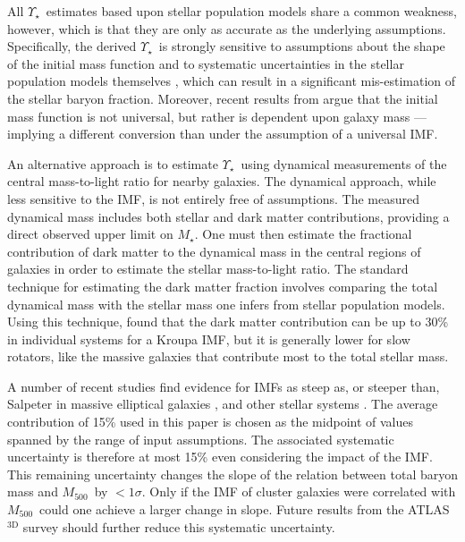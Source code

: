\documentclass[preprint]{emulateapj}
\newcommand\mfive{${M}_{500}$}
\newcommand{\mlrat}{$\Upsilon_\star$}
\begin{document}
All \mlrat\ estimates based upon stellar population models share a
common weakness, however, which is that they are only as accurate as
the underlying assumptions.  Specifically, the derived \mlrat\ is
strongly sensitive to assumptions about the shape of the initial mass
function and to systematic uncertainties in the stellar population
models themselves \citep[see e.g.,][for a detailed description of
these uncertainties]{conroy2009}, which can result in a significant
mis-estimation of the stellar baryon fraction. Moreover, recent
results from \citet{cappellari2012} argue that the initial mass
function is not universal, but rather is dependent upon galaxy mass
--- implying 
a different conversion than 
under the assumption of a universal IMF.


An alternative approach is to estimate 
\mlrat\ using dynamical measurements of the central mass-to-light
ratio for nearby galaxies. The dynamical approach, while less
sensitive to the IMF, is not entirely free of assumptions.  The
measured dynamical mass includes both stellar and dark matter
contributions, providing a direct observed upper limit on $M_\star$.
One must then estimate the fractional contribution of dark matter to
the dynamical mass in the central regions of galaxies in order to
estimate the stellar mass-to-light ratio. The standard technique for
estimating the dark matter fraction involves comparing the total
dynamical mass with the stellar mass one infers from stellar
population models. Using this technique, \citet{cappellari2006} found
that the dark matter contribution can be up to 30\% in individual
systems for a Kroupa IMF, but it is generally lower for slow rotators,
like the massive galaxies that contribute most to the total stellar
mass.

A number of recent studies find evidence for IMFs as steep as, or
steeper than, Salpeter in massive elliptical galaxies
\citep{conroy2012,vandokkum2012,cappellari2012}, and other stellar
systems \citep{zaritsky2012}. The average contribution of 15\% used in
this paper is chosen as the midpoint of values spanned by the range of
input assumptions. The associated systematic uncertainty is therefore
at most 15\% even considering the impact of the IMF. This remaining
uncertainty changes the slope of the relation between total baryon
mass and \mfive\ by $<1 \sigma$. Only if the IMF of cluster galaxies
were correlated with \mfive\ could one achieve a larger change in
slope.  Future results from the ATLAS$^\mathrm{3D}$ survey
\citep{cappellari2011} should further reduce this systematic
uncertainty.
\end{document}
